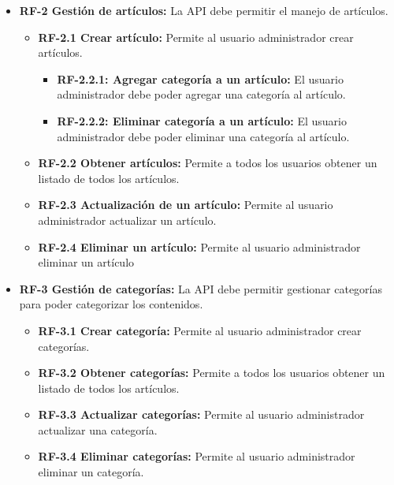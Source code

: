 \begin{itemize}
\tightlist
\item
  \textbf{RF-2 Gestión de artículos:} La API debe permitir el manejo de artículos.\\
  \begin{itemize}
  \tightlist
  \item
    \textbf{RF-2.1 Crear artículo:} Permite al usuario administrador crear artículos. \\
    \begin{itemize}
    \tightlist
    \item
      \textbf{RF-2.2.1: Agregar categoría a un artículo:} El usuario administrador debe poder agregar una categoría al artículo.\\
    \item
      \textbf{RF-2.2.2: Eliminar categoría a un artículo:} El usuario administrador debe poder eliminar una categoría al artículo. \\
    \end{itemize}
  \item
    \textbf{RF-2.2 Obtener artículos:} Permite a todos los usuarios obtener un listado de todos los artículos.\\
  \item
    \textbf{RF-2.3 Actualización de un artículo:} Permite al usuario administrador actualizar un artículo.\\
  \item
    \textbf{RF-2.4 Eliminar un artículo:} Permite al usuario administrador eliminar un artículo\\
\end{itemize}    
\end{itemize}

\begin{itemize}
\tightlist
\item
  \textbf{RF-3 Gestión de categorías:} La API debe permitir gestionar categorías para poder categorizar los contenidos.\\
  \begin{itemize}
  \tightlist
  \item
    \textbf{RF-3.1 Crear categoría:} Permite al usuario administrador crear categorías. \\
  \item
    \textbf{RF-3.2 Obtener categorías:} Permite a todos los usuarios obtener un listado de todos los artículos.\\
  \item
    \textbf{RF-3.3 Actualizar categorías:} Permite al usuario administrador actualizar una categoría.\\
  \item
    \textbf{RF-3.4 Eliminar categorías:} Permite al usuario administrador eliminar un categoría. \\
\end{itemize}    
\end{itemize}

